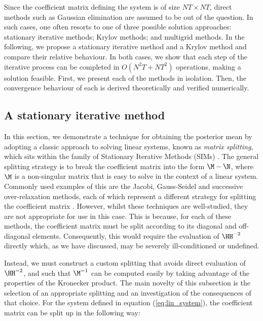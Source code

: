 Since the coefficient matrix defining the system is of size $NT \times NT $, direct methods such as Gaussian elimination are assumed to be out of the question. In such cases, one often resorts to one of three possible solution approaches: stationary iterative methods; Krylov methods; and multigrid methods. In the following, we propose a stationary iterative method and a Krylov method and compare their relative behaviour. In both cases, we show that each step of the iterative process can be completed in $O(N^2T + NT^2)$ operations, making a solution feasible. First, we present each of the methods in isolation. Then, the convergence behaviour of each is derived theoretically and verified numerically.


\subsection{A stationary iterative method}

\label{sec:SIM}

In this section, we demonstrate a technique for obtaining the posterior mean by adopting a classic approach to solving linear systems, known as \textit{matrix splitting}, which sits within the family of Stationary Iterative Methods (SIMs) \citep{Saad2003}. The general splitting strategy is to break the coefficient matrix into the form $\M - \N$, where $\M$ is a non-singular matrix that is easy to solve in the context of a linear system. Commonly used examples of this are the Jacobi, Gauss-Seidel and successive over-relaxation methods, each of which represent a different strategy for splitting the coefficient matrix \citep{Saad2003}. However, whilst these techniques are well-studied, they are not appropriate for use in this case. This is because, for each of these methods, the coefficient matrix must be split according to its diagonal and off-diagonal elements. Consequently, this would require the evaluation of $\HH^{-2}$ directly which, as we have discussed, may be severely ill-conditioned or undefined.


Instead, we must construct a custom splitting that avoids direct evaluation of $\HH^{-2}$, and such that $\M^{-1}$ can be computed easily by taking advantage of the properties of the Kronecker product. The main novelty of this subsection is the selection of an appropriate splitting and an investigation of the consequences of that choice. For the system defined in equation (\ref{eq:lin_system}), the coefficient matrix can be split up in the following way:

